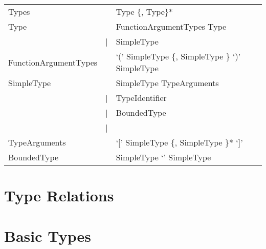 \begin{listing}
	\begin{tabular}[H]{lrl}
		Types & \lra & Type \{, Type\}* \\
		Type & \lra & FunctionArgumentTypes \ra Type\\
				& | & SimpleType \\
		FunctionArgumentTypes & \lra & `(' SimpleType \{, SimpleType \} `)' \ra SimpleType \\
		SimpleType & \lra & SimpleType TypeArguments \\
								& | & TypeIdentifier \\
								& | & BoundedType \\
								& | & \mytype \\
		TypeArguments &\lra & `[' SimpleType \{, SimpleType \}* `]' \\
		BoundedType & \lra & SimpleType `\match' SimpleType \\
	\end{tabular}
\end{listing}

\section{Type Relations}
\section{Basic Types}

